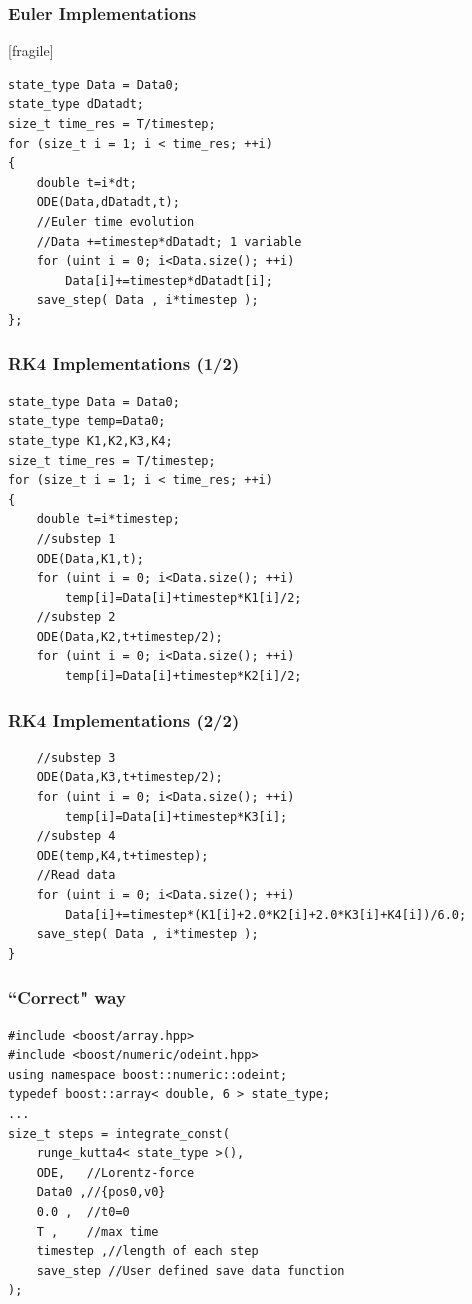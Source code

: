 \documentclass{beamer}
\begin{document}
\begin{frame}[fragile]
\frametitle{Euler Implementations}[fragile]
\begin{lstlisting}
state_type Data = Data0;
state_type dDatadt;
size_t time_res = T/timestep;
for (size_t i = 1; i < time_res; ++i)
{
    double t=i*dt;
    ODE(Data,dDatadt,t);
    //Euler time evolution
    //Data +=timestep*dDatadt; 1 variable
    for (uint i = 0; i<Data.size(); ++i)
        Data[i]+=timestep*dDatadt[i];
    save_step( Data , i*timestep );
};
\end{lstlisting}
\end{frame}





\begin{frame}[fragile]
\frametitle{RK4 Implementations (1/2)}
\begin{lstlisting}
state_type Data = Data0;
state_type temp=Data0;
state_type K1,K2,K3,K4;
size_t time_res = T/timestep;
for (size_t i = 1; i < time_res; ++i)
{
    double t=i*timestep;
    //substep 1
    ODE(Data,K1,t);
    for (uint i = 0; i<Data.size(); ++i)
        temp[i]=Data[i]+timestep*K1[i]/2;
    //substep 2
    ODE(Data,K2,t+timestep/2);
    for (uint i = 0; i<Data.size(); ++i)
        temp[i]=Data[i]+timestep*K2[i]/2;
\end{lstlisting}
\end{frame}

\begin{frame}[fragile]
\frametitle{RK4 Implementations (2/2)}
\begin{lstlisting}
    //substep 3
    ODE(Data,K3,t+timestep/2);
    for (uint i = 0; i<Data.size(); ++i)
        temp[i]=Data[i]+timestep*K3[i];
    //substep 4
    ODE(temp,K4,t+timestep);
    //Read data
    for (uint i = 0; i<Data.size(); ++i)
        Data[i]+=timestep*(K1[i]+2.0*K2[i]+2.0*K3[i]+K4[i])/6.0;
    save_step( Data , i*timestep );
}
\end{lstlisting}
\end{frame}


\begin{frame}[fragile]
\frametitle{``Correct" way}
\begin{lstlisting}
#include <boost/array.hpp>
#include <boost/numeric/odeint.hpp>
using namespace boost::numeric::odeint;
typedef boost::array< double, 6 > state_type;
...
size_t steps = integrate_const(
    runge_kutta4< state_type >(),
    ODE,   //Lorentz-force
    Data0 ,//{pos0,v0}
    0.0 ,  //t0=0
    T ,    //max time
    timestep ,//length of each step
    save_step //User defined save data function
);
\end{lstlisting}
\end{frame}
\end{document}

